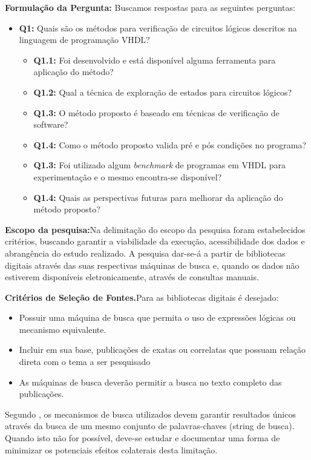 \textbf{Formulação da Pergunta:} Buscamos respostas para as seguintes perguntas:
\begin{itemize}
\item \textbf{Q1:} Quais são os métodos para verificação de circuitos lógicos descritos na linguagem de programação VHDL?
	\begin{itemize}
	\item \textbf{Q1.1:} Foi desenvolvido e está disponível alguma ferramenta para aplicação do método?
	\item \textbf{Q1.2:} Qual a técnica de exploração de estados para circuitos lógicos?
	\item \textbf{Q1.3:} O método proposto é baseado em técnicas de verificação de software?
	\item \textbf{Q1.4:} Como o método proposto valida pré e pós condições no programa?
	\item \textbf{Q1.3:} Foi utilizado algum \textit{benchmark} de programas em VHDL para experimentação e o mesmo encontra-se disponível?
	\item \textbf{Q1.4:} Quais as perspectivas futuras para melhorar da aplicação do método proposto?
	\end{itemize}
\end{itemize}

\textbf{Escopo da pesquisa:}Na delimitação do escopo da pesquisa foram estabelecidos critérios, buscando garantir a viabilidade da execução, acessibilidade dos dados e abrangência do estudo realizado. A pesquisa dar-se-á a partir de bibliotecas digitais através das suas respectivas máquinas de busca e, quando os dados não estiverem disponíveis eletronicamente, através de consultas manuais.

\textbf{Critérios de Seleção de Fontes.}Para as bibliotecas digitais é desejado:
\begin{itemize}
\item Possuir uma máquina de busca que permita o uso de expressões lógicas ou mecanismo equivalente.
\item Incluir em sua base, publicações de exatas ou correlatas que possuam relação direta com o tema a ser pesquisado
\item As máquinas de busca deverão permitir a busca no texto completo das publicações.
\end{itemize}

Segundo \cite{rocha2015verificaccao}, os mecanismos de busca utilizados devem garantir resultados únicos através da busca de um mesmo conjunto de palavras-chaves (string de busca). Quando isto não for possível, deve-se estudar e documentar uma forma de minimizar os potenciais efeitos colaterais desta limitação.

